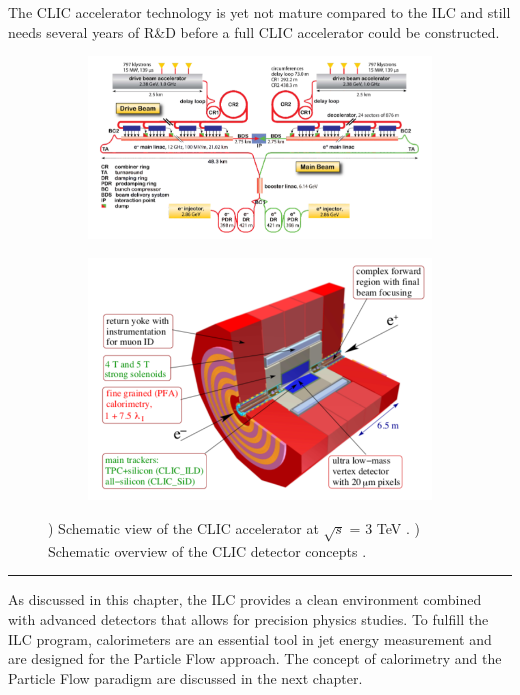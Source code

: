 The CLIC accelerator technology is yet not mature compared to the ILC and still needs several years of R\&D before a full CLIC accelerator could be constructed.

\begin{figure}[htbp!]
  \centering
  \begin{subfigure}{0.55\textwidth}
    \includegraphics[width=1\linewidth]{chap2/fig/CLIC_Machine.png}
    \caption{} \label{fig:CLICMachine}
  \end{subfigure}
  \hfill
  \begin{subfigure}{0.44\textwidth}
    \includegraphics[width=1\linewidth]{chap2/fig/CLIC_DetConcept.png}
    \caption{} \label{fig:CLICDet}
  \end{subfigure}
  \caption{) Schematic view of the CLIC accelerator at $\sqrt{s}$ = 3 TeV \cite{Aicheler:2012bya}. ) Schematic overview of the CLIC detector concepts \cite{CLIC:2016zwp}.} \label{fig:CLIC}
\end{figure}

\begin{center}
  \rule{0.5\textwidth}{.4pt}
\end{center}

As discussed in this chapter, the ILC provides a clean environment combined with advanced detectors that allows for precision physics studies. To fulfill the ILC program, calorimeters are an essential tool in jet energy measurement and are designed for the Particle Flow approach. The concept of calorimetry and the Particle Flow paradigm are discussed in the next chapter.
